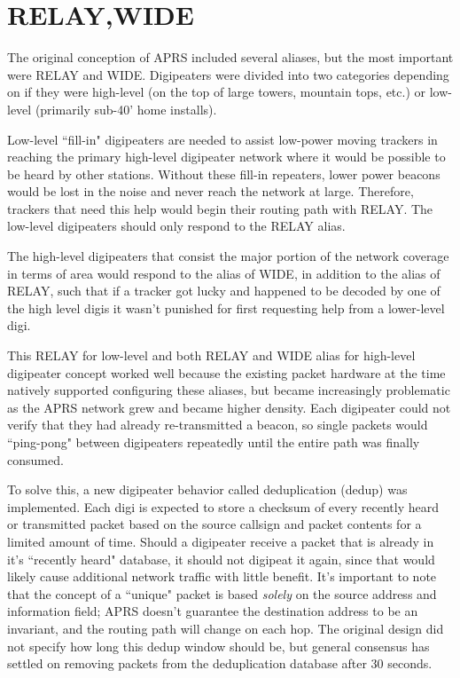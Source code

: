 \section{RELAY,WIDE}

The original conception of APRS included several aliases, but the most important were RELAY
and WIDE. Digipeaters were divided into two categories depending on if they were high-level
(on the top of large towers, mountain tops, etc.) or low-level (primarily sub-40' home installs).

Low-level ``fill-in" digipeaters are needed to assist low-power moving trackers in reaching the
primary high-level digipeater network where it would be possible to be heard by other stations.
Without these fill-in repeaters, lower power beacons would be lost in the noise and never reach the 
network at large. Therefore, trackers that need this help would begin their routing path with RELAY.
The low-level digipeaters should only respond to the RELAY alias.

The high-level digipeaters that consist the major portion of the network coverage in terms of area
would respond to the alias of WIDE, in addition to the alias of RELAY, such that if a tracker got
lucky and happened to be decoded by one of the high level digis it wasn't punished for first requesting 
help from a lower-level digi.

This RELAY for low-level and both RELAY and WIDE alias for high-level digipeater concept worked well
because the existing packet hardware at the time natively supported configuring these aliases, but
became increasingly problematic as the APRS network grew and became higher density. Each digipeater
could not verify that they had already re-transmitted a beacon, so single packets would ``ping-pong" 
between digipeaters repeatedly until the entire path was finally consumed.

To solve this, a new digipeater behavior called deduplication (dedup) was implemented.
Each digi is expected to store a checksum of every recently heard or transmitted packet
based on the source callsign and packet contents for a limited amount of time. 
Should a digipeater receive a packet that is already in it's ``recently heard" database,
it should not digipeat it again, since that would likely cause additional network traffic
with little benefit.
It's important to note that the concept of a ``unique" packet is based \emph{solely} on the
source address and information field; APRS doesn't guarantee the destination address to be
an invariant, and the routing path will change on each hop.
The original design did not specify how long this dedup window should be,
but general consensus has settled on removing packets from the deduplication database after 30 seconds.

